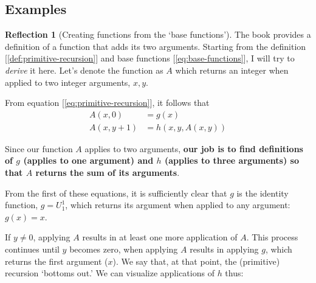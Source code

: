 \documentclass[11pt]{book}
\theoremstyle{definition}
\theoremstyle{plain}
\theoremstyle{problemstyle}
\theoremstyle{remark}
\theoremstyle{definition}
\newtheorem{reflection}{Reflection}
\begin{document}
\subsection*{Examples}
\begin{reflection}[Creating functions from the `base functions']
    The book provides a definition of a function that adds its two arguments. Starting from the definition [\ref{def:primitive-recursion}] and base functions [\ref{eq:base-functions}], I will try to \emph{derive} it here. Let's denote the function as $A$ which returns an integer when applied to two integer arguments, $x,y$.
    
    From equation [\ref{eq:primitive-recursion}], it follows that
    \begin{equation}
        \begin{aligned}
            A(x,0)&=g(x)\\
            A(x,y+1)&=h(x,y,A(x,y))
        \end{aligned}
    \end{equation}

    Since our function $A$ applies to two arguments, \textbf{our job is to find definitions of $g$ (applies to one argument) and $h$ (applies to three arguments) so that $A$ returns the sum of its arguments}.

    From the first of these equations, it is sufficiently clear that $g$ is the identity function, $g=U^1_1$, which returns its argument when applied to any argument: $g(x)=x$.

    If $y\ne0$, applying $A$ results in at least one more application of $A$. This process continues until $y$ becomes zero, when applying $A$ results in applying $g$, which returns the first argument ($x$). We say that, at that point, the (primitive) recursion `bottoms out.' We can visualize applications of $h$ thus:
            \begin{figure}[H]
                \label{fig:linear-recursion}
            \end{figure}


\end{reflection}
\end{document}
